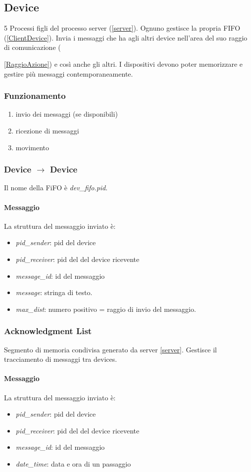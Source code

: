 \documentclass[10pt,a4paper]{article}
\begin{document}
\subsection{Device} \label{device}
5 Processi figli del processo server (\ref{server}). Ognuno gestisce la propria FIFO (\ref{ClientDevice}).
Invia i messaggi che ha agli altri device nell'area del suo raggio di comunicazione ({\ref{RaggioAzione}) e così anche gli altri.
I dispositivi devono poter memorizzare e gestire più messaggi contemporaneamente.
\subsubsection{Funzionamento}
\begin{enumerate}
\item invio dei messaggi (se disponibili)
\item ricezione di messaggi
\item movimento
\end{enumerate}
\subsubsection{Device $\longrightarrow$ Device} 
Il nome della FiFO è \emph{dev\_fifo.pid}.
\paragraph{Messaggio} 
La struttura del messaggio inviato è:
\begin{itemize}
\item \emph{pid\_sender}: pid del device
\item \emph{pid\_receiver}: pid del del device ricevente
\item \emph{message\_id}: id del messaggio
\item \emph{message}: stringa di testo.
\item \emph{max\_dist}: numero positivo = raggio di invio del messaggio. \label{RaggioAzione}
\end{itemize}
\subsubsection{Acknowledgment List} \label{acknowledgement}
Segmento di memoria condivisa generato da server \ref{server}. Gestisce il tracciamento di messaggi tra devices. 
\paragraph{Messaggio} 
La struttura del messaggio inviato è:
\begin{itemize}
\item \emph{pid\_sender}: pid del device
\item \emph{pid\_receiver}: pid del del device ricevente
\item \emph{message\_id}: id del messaggio
\item \emph{date\_time}: data e ora di un passaggio
\end{itemize}

}
\end{document}
